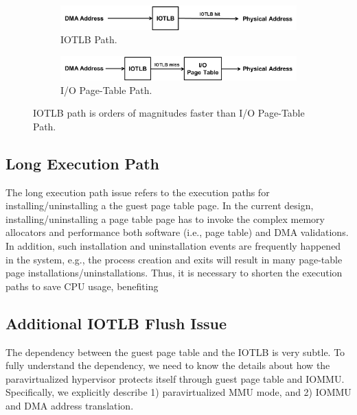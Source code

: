 \begin{figure}[!t]
    \begin{subfigure}{0.5\textwidth}
        \includegraphics[width=1\textwidth]{image/background/DMA-IOTLB-translation.png}
        \caption{\centering IOTLB Path.}
        \label{fig:subfig:a}
    \end{subfigure}%
    \vfill \vfill \vfill \vfill
    \begin{subfigure}{0.5\textwidth}
        \includegraphics[width=1\textwidth]{image/background/DMA-pt-translation.png}
        \caption{\centering I/O Page-Table Path.}
        \label{fig:subfig:b}
    \end{subfigure}
    \caption{IOTLB path is orders of magnitudes faster than I/O Page-Table Path.}
    \label{fig:dma-add-trans}
\end{figure}


\subsection{Long Execution Path}\label{sec:longpath}
The long execution path issue refers to the execution paths for installing/uninstalling a the guest page table page.
In the current design, installing/uninstalling a page table page has to invoke the complex memory allocators and performance both software (i.e., page table) and DMA validations.
In addition, such installation and uninstallation events are frequently happened in the system, e.g., the process creation and exits will result in many page-table page installations/uninstallations.
Thus, it is necessary to shorten the execution paths to save CPU usage, benefiting 

\subsection{Additional IOTLB Flush Issue}
The dependency between the guest page table and the IOTLB is very subtle.
To fully understand the dependency, we need to know the details about how the paravirtualized hypervisor protects itself through guest page table and IOMMU.
Specifically, we explicitly describe 1) paravirtualized MMU mode, and 2) IOMMU and DMA address translation.

